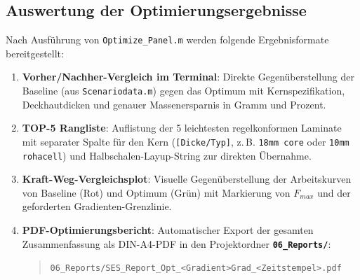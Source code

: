 \subsection*{Auswertung der Optimierungsergebnisse}
Nach Ausführung von \texttt{Optimize\_Panel.m} werden folgende Ergebnisformate bereitgestellt:
\begin{enumerate}
    \item \textbf{Vorher/Nachher-Vergleich im Terminal}: Direkte Gegenüberstellung der Baseline (aus \texttt{Scenariodata.m}) gegen das Optimum mit Kernspezifikation, Deckhautdicken und genauer Massenersparnis in Gramm und Prozent.
    \item \textbf{TOP-5 Rangliste}: Auflistung der 5 leichtesten regelkonformen Laminate mit separater Spalte für den Kern (\texttt{[Dicke/Typ]}, z.\,B. \texttt{18mm core} oder \texttt{10mm rohacell}) und Halbschalen-Layup-String zur direkten Übernahme.
    \item \textbf{Kraft-Weg-Vergleichsplot}: Visuelle Gegenüberstellung der Arbeitskurven von Baseline (Rot) und Optimum (Grün) mit Markierung von $F_{max}$ und der geforderten Gradienten-Grenzlinie.
    \item \textbf{PDF-Optimierungsbericht}: Automatischer Export der gesamten Zusammenfassung als DIN-A4-PDF in den Projektordner \textbf{\texttt{06\_Reports/}}:
    \begin{quote}
        \texttt{06\_Reports/SES\_Report\_Opt\_<Gradient>Grad\_<Zeitstempel>.pdf}
    \end{quote}
\end{enumerate}
